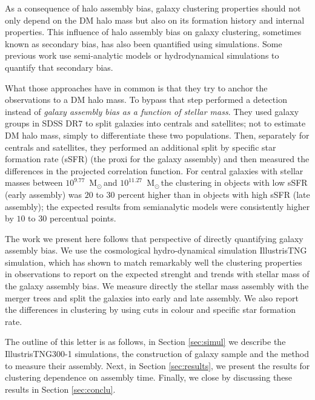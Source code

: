 \documentclass[fleqn,usenatbib]{mnras}
\newcommand{\Msun}{\,{\rm M}$_{\odot}$\,}
\begin{document}
As a consequence of halo assembly bias, galaxy clustering properties should not only depend on
the DM halo mass but also on its formation history and internal
properties.
This influence of halo assembly bias on galaxy clustering, sometimes known as
secondary bias, has also been quantified using simulations. 
Some previous work use semi-analytic models 
\citep{2007MNRAS.374.1303C,2014ApJ...794...74J,2019MNRAS.484.1133C}
or hydrodynamical simulations
\citep{2018MNRAS.480.3978A,2020MNRAS.492.2739X,2020MNRAS.tmp.1844M}
to quantify that secondary bias. 

What those approaches have in common is that they try to anchor the
observations to a DM halo mass. 
To bypass that step \citet{2013MNRAS.433..515W} performed a detection
instead of \emph{galaxy assembly bias as a function of stellar mass}.
They used galaxy groups in SDSS DR7 to split galaxies into centrals
and satellites; not to estimate DM halo mass, simply to differentiate
these two populations.
Then, separately for centrals and satellites, they performed an additional
split by specific star formation rate (sSFR) (the proxi for the galaxy
assembly) and then measured the differences in the projected correlation function.
For central galaxies with stellar masses between $10^{9.77}$ \Msun and
$10^{11.27}$ \Msun the clustering in objects with low sSFR (early
assembly) was $20$ to $30$ percent higher than in objects with high
sSFR (late assembly); the expected results from semianalytic models
were consistently higher by $10$ to $30$ percentual points. 




The work we present here follows that perspective of directly
quantifying galaxy assembly bias.
We use the cosmological hydro-dynamical simulation IllustrisTNG simulation,
which has shown to match remarkably well the clustering properties in
observations \citep{2018MNRAS.475..676S} to report on the expected
strenght and trends with stellar mass of the galaxy assembly bias.
We measure directly the stellar mass assembly with the merger trees
and split the galaxies into early and late assembly.
We also report the differences in clustering by using cuts in colour
and specific star formation rate.


The outline of this letter is as follows, in Section \ref{sec:simul}
we describe the IllustrisTNG300-1 simulations, the construction of
galaxy sample and the method to measure their assembly.
Next, in Section \ref{sec:results}, we present the results for
clustering dependence on assembly time.
Finally, we close by discussing these results in Section \ref{sec:conclu}. 
\end{document}
